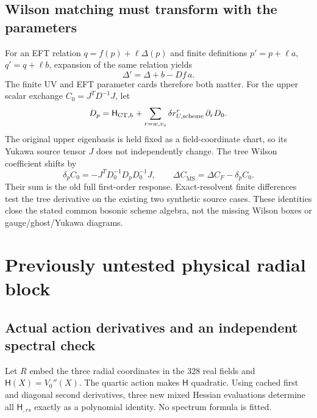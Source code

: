 \documentclass[11pt]{article}
\newcommand{\MS}{\overline{\mathrm{MS}}}
\begin{document}
\subsection{Wilson matching must transform with the parameters}
For an EFT relation $q=f(p)+\ell\Delta(p)$ and finite definitions
$p'=p+\ell a$, $q'=q+\ell b$, expansion of the same relation yields
\begin{equation}
 \Delta'=\Delta+b-Df\,a.
 \label{eq:matchingconversion}
\end{equation}
The finite UV and EFT parameter cards therefore both matter. For the
upper scalar exchange $C_0=J^TD^{-1}J$, let
\begin{equation}
 D_p=\mathsf H_{{\rm CT},h}
 +\sum_{r=w,v_s}\delta r_{U,\rm scheme}^r\,\partial_rD_0.
\end{equation}
The original upper eigenbasis is held fixed as a field-coordinate chart,
so its Yukawa source tensor $J$ does not independently change. The tree
Wilson coefficient shifts by
\begin{equation}
 \delta_pC_0=-J^TD_0^{-1}D_pD_0^{-1}J,
 \qquad \Delta C_{\MS}=\Delta C_F-\delta_pC_0.
\end{equation}
Their sum is the old full first-order response. Exact-resolvent finite
differences test the tree derivative on the existing two synthetic source
cases. These identities close the stated common bosonic scheme algebra,
not the missing Wilson boxes or gauge/ghost/Yukawa diagrams.

\section{Previously untested physical radial block}
\subsection{Actual action derivatives and an independent spectral check}
Let $R$ embed the three radial coordinates in the 328 real fields and
$\mathsf H(X)=V_0''(X)$. The quartic action makes $\mathsf H$ quadratic.
Using cached first and diagonal second derivatives, three new mixed
Hessian evaluations determine all $\mathsf H_{,rs}$ exactly as a
polynomial identity. No spectrum formula is fitted.
\end{document}
